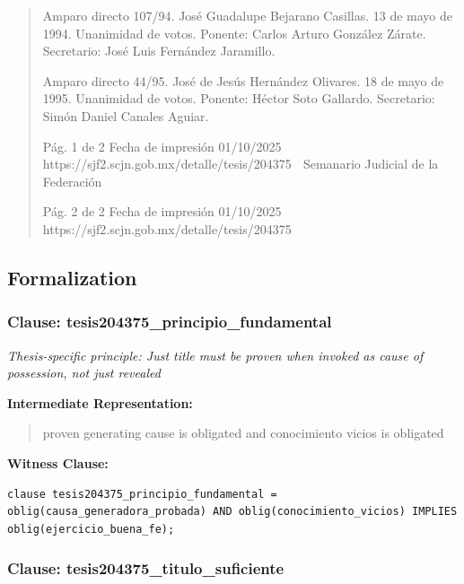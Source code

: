 \documentclass[11pt,a4paper]{article}
\begin{document}
\begin{quote}
Amparo directo 107/94. José Guadalupe Bejarano Casillas. 13 de mayo de 1994. Unanimidad de
votos. Ponente: Carlos Arturo González Zárate. Secretario: José Luis Fernández Jaramillo.

Amparo directo 44/95. José de Jesús Hernández Olivares. 18 de mayo de 1995. Unanimidad de
votos. Ponente: Héctor Soto Gallardo. Secretario: Simón Daniel Canales Aguiar.




                                              Pág. 1 de 2             Fecha de impresión 01/10/2025
  https://sjf2.scjn.gob.mx/detalle/tesis/204375
                                                Semanario Judicial de la Federación




                                           Pág. 2 de 2       Fecha de impresión 01/10/2025
https://sjf2.scjn.gob.mx/detalle/tesis/204375

\end{quote}

\subsection{Formalization}

\subsubsection{Clause: tesis204375\_principio\_fundamental}

\textit{Thesis-specific principle: Just title must be proven when invoked as cause of possession, not just revealed}

\textbf{Intermediate Representation:}

\begin{quote}
proven generating cause is obligated and conocimiento vicios is obligated
\end{quote}

\textbf{Witness Clause:}

\begin{lstlisting}[style=witnessstyle, language=Witness]
clause tesis204375_principio_fundamental = oblig(causa_generadora_probada) AND oblig(conocimiento_vicios) IMPLIES oblig(ejercicio_buena_fe);
\end{lstlisting}

\subsubsection{Clause: tesis204375\_titulo\_suficiente}
\end{document}
